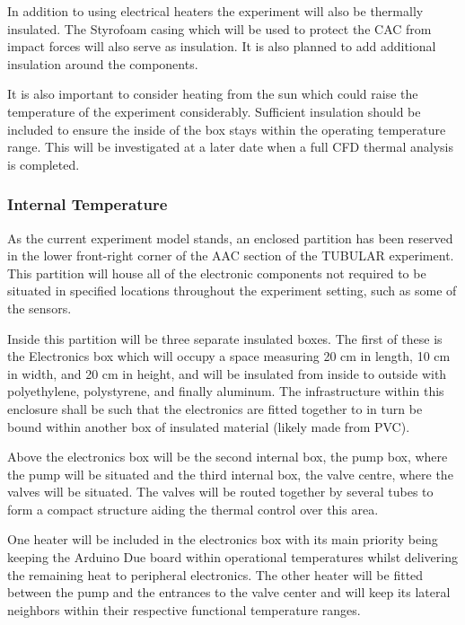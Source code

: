\begin{centering}
In addition to using electrical heaters the experiment will also be thermally insulated. The Styrofoam casing which will be used to protect the CAC from impact forces will also serve as insulation. It is also planned to add additional insulation around the components.  
\end{centering}

\begin{centering}
It is also important to consider heating from the sun which could raise the temperature of the experiment considerably. Sufficient insulation should be included to ensure the inside of the box stays within the operating temperature range. This will be investigated at a later date when a full CFD thermal analysis is completed.
\end{centering}
\bigskip

\pagebreak


\raggedbottom

\subsubsection{Internal Temperature}

As the current experiment model stands, an enclosed partition has been reserved in the lower front-right corner of the AAC section of the TUBULAR experiment. This partition will house all of the electronic components not required to be situated in specified locations throughout the experiment setting, such as some of the sensors. 

Inside this partition will be three separate insulated boxes. The first of these is the Electronics box which will occupy a space measuring 20 cm in length, 10 cm in width, and 20 cm in height, and will be insulated from inside to outside with polyethylene, polystyrene, and finally aluminum. The infrastructure within this enclosure shall be such that the electronics are fitted together to in turn be bound within another box of insulated material (likely made from PVC). 

Above the electronics box will be the second internal box, the pump box, where the pump will be situated and the third internal box, the valve centre, where the valves will be situated. The valves will be routed together by several tubes to form a compact structure aiding the thermal control over this area. 

One heater will be included in the electronics box with its main priority being keeping the Arduino Due board within operational temperatures whilst delivering the remaining heat to peripheral electronics. The other heater will be fitted between the pump and the entrances to the valve center and will keep its lateral neighbors within their respective functional temperature ranges.

